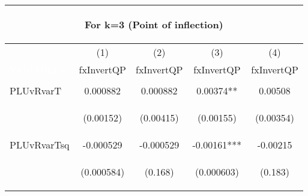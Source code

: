 \begin{center}
\begin{tabular}{lcccc}
\multicolumn{5}{c}{\begin{large}For k=3 (Point of inflection)\end{large}} \\ \midrule
 & (1) & (2) & (3) & (4) \\
\textcolor{white}{VARIABLES} & fxInvertQP & fxInvertQP & fxInvertQP & fxInvertQP \\ \midrule
\vspace{4pt} & \begin{footnotesize}\end{footnotesize} & \begin{footnotesize}\end{footnotesize} & \begin{footnotesize}\end{footnotesize} & \begin{footnotesize}\end{footnotesize} \\
PLUvRvarT & 0.000882 & 0.000882 & 0.00374** & 0.00508 \\
\vspace{4pt} & \begin{footnotesize}(0.00152)\end{footnotesize} & \begin{footnotesize}(0.00415)\end{footnotesize} & \begin{footnotesize}(0.00155)\end{footnotesize} & \begin{footnotesize}(0.00354)\end{footnotesize} \\
PLUvRvarTsq & -0.000529 & -0.000529 & -0.00161*** & -0.00215 \\
\vspace{4pt} & \begin{footnotesize}(0.000584)\end{footnotesize} & \begin{footnotesize}(0.168)\end{footnotesize} & \begin{footnotesize}(0.000603)\end{footnotesize} & \begin{footnotesize}(0.183)\end{footnotesize} \\

\end{tabular}
\end{center}
